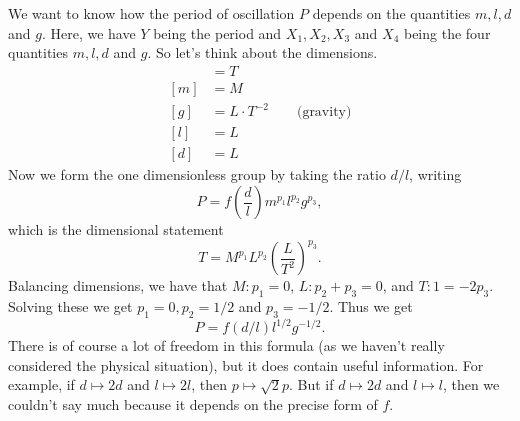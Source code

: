 \documentclass[a4paper]{scrreprt}
\begin{document}
\begin{example}
\begin{center}
	
	\end{center}
	We want to know how the period of oscillation $P$ depends on the quantities $m, l, d$ and $g$. Here, we have $Y$ being the period and $X_1, X_2, X_3$ and $X_4$ being the four quantities $m, l, d$ and $g$. So let's think about the dimensions.
	\begin{align*}
		[P] &= T \\
		[m] &= M\\
		[g] &= L \cdot T^{-2} \quad \quad \text{(gravity)} \\
		[l] &= L\\
		[d] &= L
	\end{align*}
	Now we form the one dimensionless group by taking the ratio $d/l$, writing
	$$
	P = f\left(\frac{d}{l}\right) m^{p_1} l^{p_2} g^{p_3},
	$$
	which is the dimensional statement
	$$
	T = M^{p_1} L^{p_2} \left(\frac{L}{T^2}\right)^{p_3}.
	$$
	Balancing dimensions, we have that $M: p_1 = 0$, $L: p_2 + p_3 = 0$, and $T: 1 = -2p_3$. Solving these we get $p_1 = 0, p_2 = 1/2$ and $p_3 = -1/2$. Thus we get
	$$
	P = f(d/l) l^{1/2} g^{-1/2}.
	$$
	There is of course a lot of freedom in this formula (as we haven't really considered the physical situation), but it does contain useful information. For example, if $d \mapsto 2d$ and $l \mapsto 2l$, then $p \mapsto \sqrt{2}p$. But if $d \mapsto 2d$ and $l \mapsto l$, then we couldn't say much because it depends on the precise form of $f$. 
\end{example}
\end{document}
